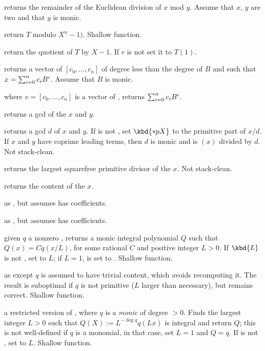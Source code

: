  returns the remainder of the Euclidean
division of $x$ mod $y$. Assume that $x$, $y$ are two  and that
$y$ is monic.

 return $T$ modulo $X^n - 1)$. Shallow
function.

 return the quotient of $T$ by $X-1$.
If $r$ is not  set it to $T(1)$.

 returns a vector of 
$[c_0,\ldots,c_n]$ of degree less than the degree of $B$ and such that
$x=\sum_{i=0}^{n}{c_i\*B^i}$. Assume that $B$ is monic.

 where $v=[c_0,\ldots,c_n]$
is a vector of , returns $\sum_{i=0}^{n}{c_i\*B^i}$.

 returns a gcd of the  $x$ and $y$.

 returns a gcd $d$ of $x$ and
$y$. If  is not , set $\kbd{*pX}$ to the primitive part
of $x/d$. If $x$ and $y$ have coprime leading terms, then $d$ is monic and
 is $(x)$ divided by $d$. Not stack-clean.

 returns the largest squarefree primitive divisor
of the  $x$. Not stack-clean.

 returns the content of the  $x$.

 as , but assumes  has 
coefficients.

 as , but assumes
 has  coefficients.

 given $q$ a nonzero ,
returns a monic integral polynomial $Q$ such that $Q(x) = C q(x/L)$, for some
rational $C$ and positive integer $L > 0$. If $\kbd{L}$ is not ,
set  to $L$; if $L = 1$,  is set to . Shallow
function.

 as  except
$q$ is assumed to have trivial content, which avoids recomputing it.
The result is suboptimal if $q$ is not primitive ($L$ larger than
necessary), but remains correct. Shallow function.

 a restricted version of
, where $q$ is a \emph{monic} 
of degree $> 0$. Finds the largest integer $L > 0$ such that
$Q(X) := L^{-\deg q} q(Lx)$ is integral and return $Q$; this is not
well-defined if $q$ is a monomial, in that case, set $L=1$ and $Q = q$. If
 is not , set  to $L$. Shallow function.

